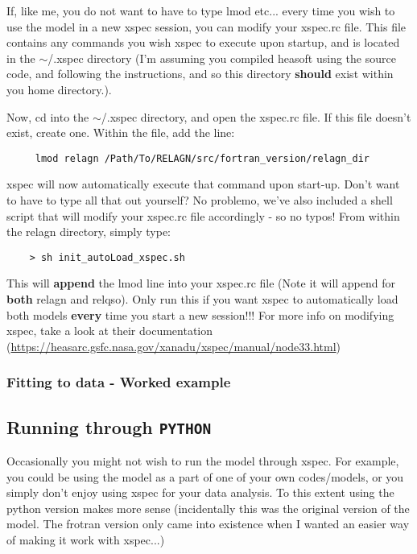 \documentclass[a4paper, 11pt, times, onecolumn]{article}
\begin{document}
If, like me, you do not want to have to type {\sc lmod etc...} every time you wish to use the model in a new {\sc xspec} session, you can modify your {\sc xspec.rc} file. This file contains any commands you wish {\sc xspec} to execute upon startup, and is located in the {\sc $\sim$/.xspec} directory (I'm assuming you compiled {\sc heasoft} using the source code, and following the instructions, and so this directory {\bf should} exist within you home directory.).

Now, cd into the {\sc $\sim$/.xspec} directory, and open the xspec.rc file. If this file doesn't exist, create one. Within the file, add the line:

\begin{verbatim}
	 lmod relagn /Path/To/RELAGN/src/fortran_version/relagn_dir
\end{verbatim}

\noindent
{\sc xspec} will now automatically execute that command upon start-up.  
Don't want to have to type all that out yourself? No problemo, we've also included a shell script that will modify your xspec.rc file accordingly - so no typos! From within the {\sc relagn} directory, simply type:

\begin{verbatim}
	> sh init_autoLoad_xspec.sh
\end{verbatim}

\noindent
This will {\bf append} the lmod line into your xspec.rc file (Note it will append for {\bf both} {\sc relagn} and {\sc relqso}). Only run this if you want {\sc xspec} to automatically load both models {\bf every} time you start a new session!!! For more info on modifying {\sc xspec}, take a look at their documentation (\url{https://heasarc.gsfc.nasa.gov/xanadu/xspec/manual/node33.html})


\subsubsection{Fitting to data - Worked example}




\subsection{Running through {\tt PYTHON}}

Occasionally you might not wish to run the model through {\sc xspec}. For example, you could be using the model as a part of one of your own codes/models, or you simply don't enjoy using {\sc xspec} for your data analysis. To this extent using the {\sc python} version makes more sense (incidentally this was the original version of the model. The {\sc frotran} version only came into existence when I wanted an easier way of making it work with {\sc xspec}...) 
\end{document}
